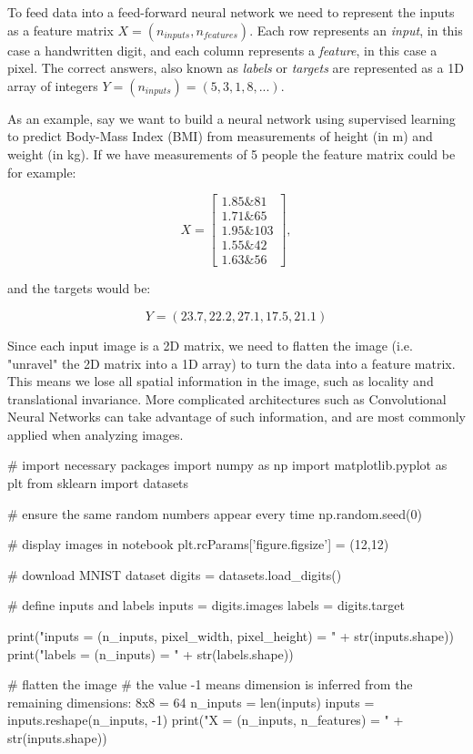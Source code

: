 \documentclass[%
oneside,                 %
final,                   %
10pt]{article}
\begin{document}
To feed data into a feed-forward neural network we need to represent
the inputs as a feature matrix $X = (n_{inputs}, n_{features})$.  Each
row represents an \emph{input}, in this case a handwritten digit, and
each column represents a \emph{feature}, in this case a pixel.  The
correct answers, also known as \emph{labels} or \emph{targets} are
represented as a 1D array of integers 
$Y = (n_{inputs}) = (5, 3, 1, 8,...)$.

As an example, say we want to build a neural network using supervised learning to predict Body-Mass Index (BMI) from
measurements of height (in m)  
and weight (in kg). If we have measurements of 5 people the feature matrix could be for example:  

$$ X = \begin{bmatrix}
1.85 {\&} 81\\
1.71 {\&} 65\\
1.95 {\&} 103\\
1.55 {\&} 42\\
1.63 {\&} 56
\end{bmatrix} ,$$  

and the targets would be:  

$$ Y = (23.7, 22.2, 27.1, 17.5, 21.1) $$  

Since each input image is a 2D matrix, we need to flatten the image
(i.e. "unravel" the 2D matrix into a 1D array) to turn the data into a
feature matrix. This means we lose all spatial information in the
image, such as locality and translational invariance. More complicated
architectures such as Convolutional Neural Networks can take advantage
of such information, and are most commonly applied when analyzing
images.


\bpycod
# import necessary packages
import numpy as np
import matplotlib.pyplot as plt
from sklearn import datasets


# ensure the same random numbers appear every time
np.random.seed(0)

# display images in notebook
plt.rcParams['figure.figsize'] = (12,12)


# download MNIST dataset
digits = datasets.load_digits()

# define inputs and labels
inputs = digits.images
labels = digits.target

print("inputs = (n_inputs, pixel_width, pixel_height) = " + str(inputs.shape))
print("labels = (n_inputs) = " + str(labels.shape))


# flatten the image
# the value -1 means dimension is inferred from the remaining dimensions: 8x8 = 64
n_inputs = len(inputs)
inputs = inputs.reshape(n_inputs, -1)
print("X = (n_inputs, n_features) = " + str(inputs.shape))
\end{document}
